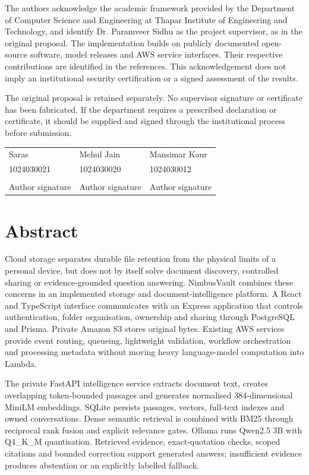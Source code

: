 \documentclass[11pt,a4paper,oneside]{report}
\begin{document}
The authors acknowledge the academic framework provided by the Department of Computer Science and Engineering at Thapar Institute of Engineering and Technology, and identify Dr. Paramveer Sidhu as the project supervisor, as in the original proposal. The implementation builds on publicly documented open-source software, model releases and AWS service interfaces. Their respective contributions are identified in the references. This acknowledgement does not imply an institutional security certification or a signed assessment of the results.

The original proposal is retained separately. No supervisor signature or certificate has been fabricated. If the department requires a prescribed declaration or certificate, it should be supplied and signed through the institutional process before submission.

\vspace{12mm}\begin{tabularx}{\linewidth}{YYY}\toprule Saras&Mehul Jain&Mansimar Kaur\\1024030021&1024030020&1024030012\\\addlinespace[12mm]\hrulefill&\hrulefill&\hrulefill\\Author signature&Author signature&Author signature\\\bottomrule\end{tabularx}
\chapter*{Abstract}
Cloud storage separates durable file retention from the physical limits of a personal device, but does not by itself solve document discovery, controlled sharing or evidence-grounded question answering. NimbusVault combines these concerns in an implemented storage and document-intelligence platform. A React and TypeScript interface communicates with an Express application that controls authentication, folder organisation, ownership and sharing through PostgreSQL and Prisma. Private Amazon S3 stores original bytes. Existing AWS services provide event routing, queueing, lightweight validation, workflow orchestration and processing metadata without moving heavy language-model computation into Lambda.

The private FastAPI intelligence service extracts document text, creates overlapping token-bounded passages and generates normalised 384-dimensional MiniLM embeddings. SQLite persists passages, vectors, full-text indexes and owned conversations. Dense semantic retrieval is combined with BM25 through reciprocal rank fusion and explicit relevance gates. Ollama runs Qwen2.5 3B with Q4\_K\_M quantisation. Retrieved evidence, exact-quotation checks, scoped citations and bounded correction support generated answers; insufficient evidence produces abstention or an explicitly labelled fallback.
\end{document}
